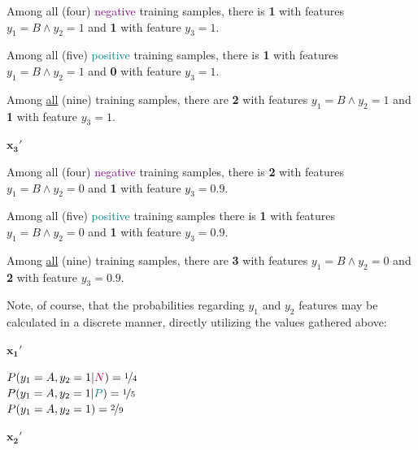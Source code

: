\documentclass[12pt]{article}
\begin{document}
\begin{enumerate}[leftmargin=\labelsep]
\begin{multicols}{3}
          Among all (four) \textcolor{purple}{negative} training samples, there is \textbf{1} with features $y_1 = B \wedge y_2 = 1$ and
          \textbf{1} with feature $y_3 = 1$.

          Among all (five) \textcolor{teal}{positive} training samples, there is \textbf{1} with features $y_1 = B \wedge y_2 = 1$ and
          \textbf{0} with feature $y_3 = 1$.

          Among \underline{all} (nine) training samples, there are \textbf{2} with features $y_1 = B \wedge y_2 = 1$ and
          \textbf{1} with feature $y_3 = 1$.

          \columnbreak

          $\mathbf{x_3'}$

          Among all (four) \textcolor{purple}{negative} training samples, there is \textbf{2} with features $y_1 = B \wedge y_2 = 0$ and
          \textbf{1} with feature $y_3 = 0.9$.

          Among all (five) \textcolor{teal}{positive} training samples there is \textbf{1} with features $y_1 = B \wedge y_2 = 0$ and
          \textbf{1} with feature $y_3 = 0.9$.

          Among \underline{all} (nine) training samples, there are \textbf{3} with features $y_1 = B \wedge y_2 = 0$ and
          \textbf{2} with feature $y_3 = 0.9$.

        \end{multicols}

        Note, of course, that the probabilities regarding $y_1$ and $y_2$ features may
        be calculated in a discrete manner, directly utilizing the values gathered above:

        \begin{multicols}{3}
          \setlength{\columnseprule}{1pt}
          \def\columnseprulecolor{\color{black}}

          \begin{center}
            $\mathbf{x_1'}$
          \end{center}

          $P(y_1 = A, y_2 = 1 | \textcolor{purple}{N}) = \nicefrac{1}{4}$ \\
          $P(y_1 = A, y_2 = 1 | \textcolor{teal}{P}) = \nicefrac{1}{5}$ \\
          $P(y_1 = A, y_2 = 1) = \nicefrac{2}{9}$

          \columnbreak

          \begin{center}
            $\mathbf{x_2'}$
          \end{center}


\end{multicols}
\end{enumerate}
\end{document}
